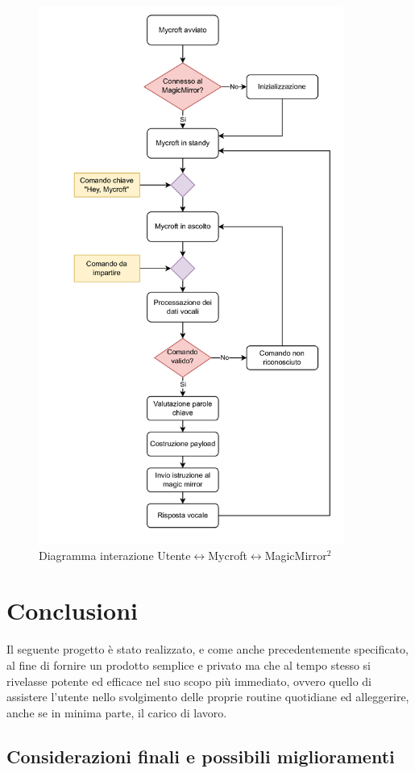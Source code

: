 \documentclass[12pt,a4paper]{article}
\begin{document}
\begin{figure}[H]
  \centering
  \includegraphics[width=10cm]{mycroft-process.png}
  \caption{Diagramma interazione Utente$\leftrightarrow$Mycroft$\leftrightarrow$MagicMirror$^2$}
  \label{diagramma-mycroft}
\end{figure}

\newpage
\section{Conclusioni}\label{conclusioni}

Il seguente progetto \`e stato realizzato, e come anche precedentemente specificato, al fine di 
fornire un prodotto semplice e privato ma che al tempo stesso si rivelasse potente ed efficace
nel suo scopo pi\`u immediato, ovvero quello di assistere l'utente nello svolgimento delle proprie
routine quotidiane ed alleggerire, anche se in minima parte, il carico di lavoro.

\subsection{Considerazioni finali e possibili miglioramenti}
\end{document}
